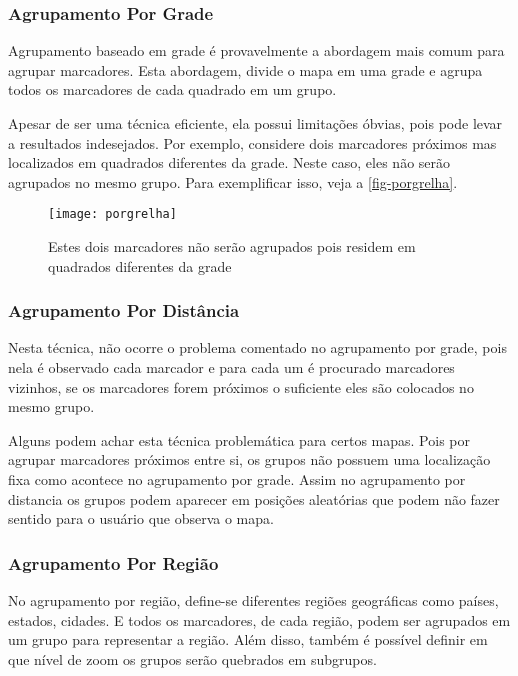 		\subsubsection{Agrupamento Por Grade}
		Agrupamento baseado em grade é provavelmente a abordagem mais comum para agrupar marcadores. Esta abordagem, divide o mapa em uma grade e agrupa todos os marcadores de cada quadrado em um grupo. 
		
		Apesar de ser uma técnica eficiente, ela possui limitações óbvias, pois pode levar a resultados indesejados. Por exemplo, considere dois marcadores próximos mas localizados em quadrados diferentes da grade. Neste caso, eles não serão agrupados no mesmo grupo. Para exemplificar isso, veja a \autoref{fig-porgrelha}. 

\begin{figure}[htb]
	\caption{\label{fig-porgrelha}Estes dois marcadores não serão agrupados pois residem em quadrados diferentes da grade}
	\begin{center}
	    \texttt{[image: porgrelha]}
	\end{center}
\end{figure}

		\subsubsection{Agrupamento Por Distância}
			Nesta técnica, não ocorre o problema comentado no agrupamento por grade, pois nela é observado cada marcador e para cada um é procurado marcadores vizinhos, se os marcadores forem próximos o suficiente eles são colocados no mesmo grupo.
		
			Alguns podem achar esta técnica problemática para certos mapas. Pois por agrupar marcadores próximos entre si, os grupos não possuem uma localização fixa como acontece no agrupamento por grade. Assim no agrupamento por distancia os grupos podem aparecer em posições aleatórias que podem não fazer sentido para o usuário que observa o mapa.
	
		\subsubsection{Agrupamento Por Região}
			No agrupamento por região, define-se diferentes regiões geográficas como países, estados, cidades. E todos os marcadores, de cada região, podem ser agrupados em um grupo para representar a região. Além disso, também é possível definir em que nível de zoom os grupos serão quebrados em subgrupos. 
			
